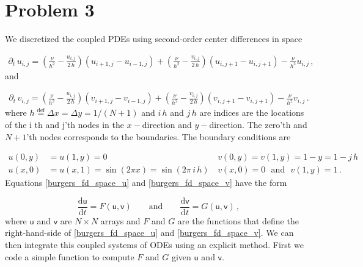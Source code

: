 \documentclass[11pt]{article}
\newcommand{\defn}{\stackrel{\text{def}}{=}}
\newcommand{\dd}{\mathrm{d}}
\newcommand{\su}{\mathsf{u}}
\newcommand{\sv}{\mathsf{v}}
\newcommand{\com}{\, ,}
\def\beq{\begin{equation}}
\def\eeq{\end{equation}}
\begin{document}
\section*{Problem 3}

We discretized the coupled PDEs using second-order center differences in space

\begin{align}
\label{burgers_fd_space_u}
\partial_t \, u_{i,j} = \left(\frac{\nu}{h^2} - \frac{u_{i,j}}{2\, h} \right)\left(u_{i+1,j}-u_{i-1,j}\right) + \left(\frac{\nu}{h^2} - \frac{v_{i,j}}{2\, h} \right)\left(u_{i,j+1}-u_{i,j+1}\right) -\frac{\nu}{h^2}u_{i,j} \, ,  
\end{align}
and 

\begin{align}
\label{burgers_fd_space_v}
\partial_t \, v_{i,j} = \left(\frac{\nu}{h^2} - \frac{u_{i,j}}{2\, h} \right)\left(v_{i+1,j}-v_{i-1,j}\right) + \left(\frac{\nu}{h^2} - \frac{v_{i,j}}{2\, h} \right)\left(v_{i,j+1}-v_{i,j+1}\right) -\frac{\nu}{h^2}v_{i,j} \, .  
\end{align}
where $h \defn \Delta x = \Delta y = 1/(N+1)$ and $i\, h$ and $j\, h$ are indices are the locations of the i
th and j'th nodes in the $x-$direction and $y-$direction. The zero'th and $N+1$'th nodes corresponds to the boundaries. The boundary conditions are

\begin{align}
    \label{burgers_bc}
    u(0,y) &= u(1,y) = 0\,  & v(0,y) = v(1,y) = 1 - y = 1 - j \, h \nonumber \\
    u(x,0) &= u(x,1) = \sin \left(2\pi x\right) = \sin \left(2\pi\,i\,h\right)\,  &  v(x,0) = 0 \:\:\: \text{and}\:\:\: v(1,y) = 1\, . 
\end{align}
Equations \eqref{burgers_fd_space_u} and  \eqref{burgers_fd_space_v} have the form

\beq
\label{system_odes}
\frac{\dd \su}{\dd t} = F(\su,\sv) \qquad \text{and} \qquad \frac{\dd \sv}{\dd t} = G(\su,\sv)\com
\eeq
where $\su$ and $\sv$ are $N\times N$ arrays and $F$ and $G$ are the functions that define the right-hand-side of   \eqref{burgers_fd_space_u} and \eqref{burgers_fd_space_v}. We can then integrate this coupled systems of ODEs using an explicit method. First we code a simple function to compute $F$ and $G$ given $\su$ and $\sv$.
\end{document}
